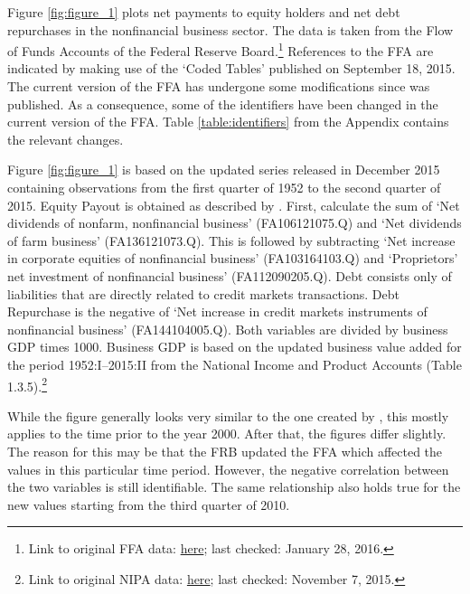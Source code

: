 \documentclass[12pt,a4paper,leqno]{article}
\begin{document}
Figure \ref{fig:figure_1} plots net payments to equity holders and net debt repurchases in the nonfinancial business sector. The data is taken from the Flow of Funds Accounts of the Federal Reserve Board.\footnote{Link to original FFA data: \href{http://www.federalreserve.gov/datadownload/Download.aspx?rel=Z1&series=1b491b6891f88f8604172bc2f3970d52&from=03/01/1952&to=06/30/2015&lastObs=&filetype=spreadsheetml&label=include&layout=seriescolumn}{here}; last checked: January 28, 2016.}
References to the FFA are indicated by making use of the ‘Coded Tables’ published on September 18, 2015. The current version of the FFA has undergone some modifications since \citet{JERMANNfinancial} was published. As a consequence, some of the identifiers have been changed in the current version of the FFA. Table \ref{table:identifiers} from the Appendix contains the relevant changes.

Figure \ref{fig:figure_1} is based on the updated series released in December 2015 containing observations from the first quarter of 1952 to the second quarter of 2015. Equity Payout is obtained as described by \citeauthor{JERMANNfinancial}. First, calculate the sum of ‘Net dividends of nonfarm, nonfinancial business’ (FA106121075.Q) and ‘Net dividends of farm business’ (FA136121073.Q). This is followed by subtracting ‘Net increase in corporate equities of nonfinancial business’ (FA103164103.Q) and ‘Proprietors’ net investment of nonfinancial business’ (FA112090205.Q). Debt consists only of liabilities that are directly related to credit markets transactions.  Debt Repurchase is the negative of ‘Net increase in credit markets instruments of nonfinancial business’ (FA144104005.Q). Both variables are divided by business GDP times 1000. Business GDP is based on the updated business value added for the period 1952:I--2015:II from the National Income and Product Accounts (Table 1.3.5).\footnote{Link to original NIPA data: \href{http://www.bea.gov//national/nipaweb/DownSS2.asp}{here}; last checked: November 7, 2015.} 

While the figure generally looks very similar to the one created by \citeauthor{JERMANNfinancial}, this mostly applies to the time prior to the year 2000. After that, the figures differ slightly. The reason for this may be that the FRB updated the FFA which affected the values in this particular time period. However, the negative correlation between the two variables is still identifiable. The same relationship also holds true for the new values starting from the third quarter of 2010. 
\newpage
\vfill
{}


\end{document}
